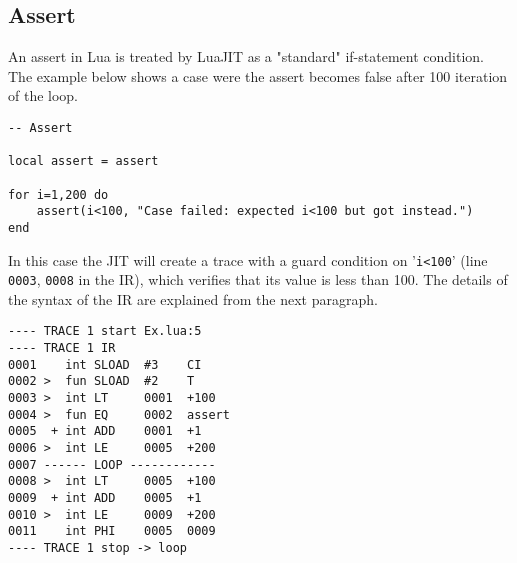 \begin{comment}
\begin{multicols}{2}
\noindent
\textbf{Prerequisites}\\
To read this chapter you are supposed to know: what is a tracing JIT; the mechanism of traces and side traces; what are intermediate representation (IR) and bytecode (see Chapter \ref{}).

\columnbreak
\noindent
\textbf{What you want to learn}\\
After reading this chapter you will learn how LuaJIT creates traces and how they are connected to each other.
\end{multicols}
\end{comment}

\subsection{Assert}
An assert in Lua is treated by LuaJIT as a "standard" if-statement condition. The example below shows a case were the assert becomes false after 100 iteration of the loop. 
\begin{mdframed}[style=LuaStyleFrame]
\begin{lstlisting}[style=LuaStyle]
-- Assert

local assert = assert 

for i=1,200 do
	assert(i<100, "Case failed: expected i<100 but got instead.")
end
\end{lstlisting}
\end{mdframed}

\noindent
In this case the JIT will create a trace with a guard condition on '\texttt{i<100}' (line \texttt{0003}, \texttt{0008} in the IR), which verifies that its value is less than 100. The details of the syntax of the IR are explained from the next paragraph. 

\begin{multicols}{2}
\begin{lstlisting}[style=DumpStyle]
---- TRACE 1 start Ex.lua:5
---- TRACE 1 IR
0001    int SLOAD  #3    CI
0002 >  fun SLOAD  #2    T
0003 >  int LT     0001  +100
0004 >  fun EQ     0002  assert
0005  + int ADD    0001  +1  
0006 >  int LE     0005  +200
0007 ------ LOOP ------------
0008 >  int LT     0005  +100
0009  + int ADD    0005  +1  
0010 >  int LE     0009  +200
0011    int PHI    0005  0009
---- TRACE 1 stop -> loop
\end{lstlisting}
\end{multicols}

